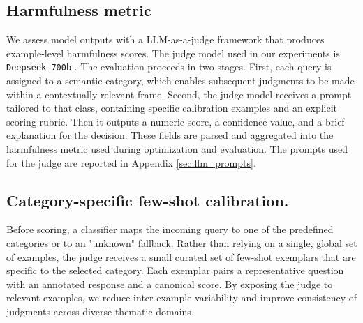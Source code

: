 \documentclass{article}
\theoremstyle{plain}
\theoremstyle{definition}
\theoremstyle{remark}
\begin{document}

\subsection{Harmfulness metric} \label{subsec:harm_metric}
We assess model outputs with a LLM-as-a-judge framework that produces example-level harmfulness scores. The judge model used in our experiments is \texttt{Deepseek-700b} \cite{bi2024deepseek}. The evaluation proceeds in two stages. First, each query is assigned to a semantic category, which enables subsequent judgments to be made within a contextually relevant frame. Second, the judge model receives a prompt tailored to that class, containing specific calibration examples and an explicit scoring rubric. Then it outputs a numeric score, a confidence value, and a brief explanation for the decision. These fields are parsed and aggregated into the harmfulness metric used during optimization and evaluation. The prompts used for the judge are reported in Appendix \ref{sec:llm_prompts}.

\subsection{Category-specific few-shot calibration.} 
Before scoring, a classifier maps the incoming query to one of the predefined categories or to an "unknown" fallback. 
Rather than relying on a single, global set of examples, the judge receives a small curated set of few-shot exemplars that are specific to the selected category. Each exemplar pairs a representative question with an annotated response and a canonical score. By exposing the judge to relevant examples, we reduce inter-example variability and improve consistency of judgments across diverse thematic domains.
\end{document}
